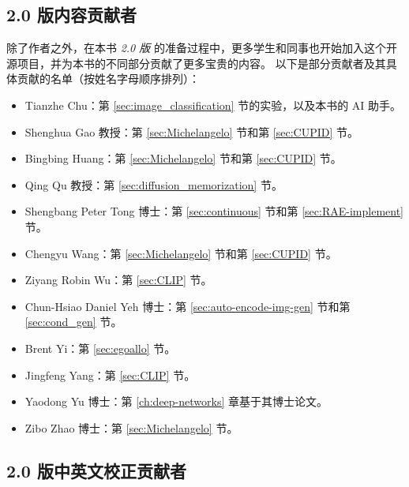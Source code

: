 \documentclass[../../book-main.tex]{subfiles}
\begin{document}
\subsection*{2.0 版内容贡献者}
除了作者之外，在本书 {\em 2.0 版} 的准备过程中，更多学生和同事也开始加入这个开源项目，并为本书的不同部分贡献了更多宝贵的内容。
以下是部分贡献者及其具体贡献的名单（按姓名字母顺序排列）：
\begin{itemize}
    \item Tianzhe Chu：第 \ref{sec:image_classification} 节的实验，以及本书的 AI 助手。
    \item Shenghua Gao 教授：第 \ref{sec:Michelangelo} 节和第 \ref{sec:CUPID} 节。
    \item Bingbing Huang：第 \ref{sec:Michelangelo} 节和第 \ref{sec:CUPID} 节。
    \item Qing Qu 教授：第 \ref{sec:diffusion_memorization} 节。
    \item Shengbang Peter Tong 博士：第 \ref{sec:continuous} 节和第 \ref{sec:RAE-implement} 节。
    \item Chengyu Wang：第 \ref{sec:Michelangelo} 节和第 \ref{sec:CUPID} 节。
    \item Ziyang Robin Wu：第 \ref{sec:CLIP} 节。
    \item Chun-Hsiao Daniel Yeh 博士：第 \ref{sec:auto-encode-img-gen} 节和第 \ref{sec:cond_gen} 节。
    \item Brent Yi：第 \ref{sec:egoallo} 节。
    \item Jingfeng Yang：第 \ref{sec:CLIP} 节。
    \item Yaodong Yu 博士：第 \ref{ch:deep-networks} 章基于其博士论文。
    \item Zibo Zhao 博士：第 \ref{sec:Michelangelo} 节。

\end{itemize}

\subsection*{2.0 版中英文校正贡献者}
\end{document}
